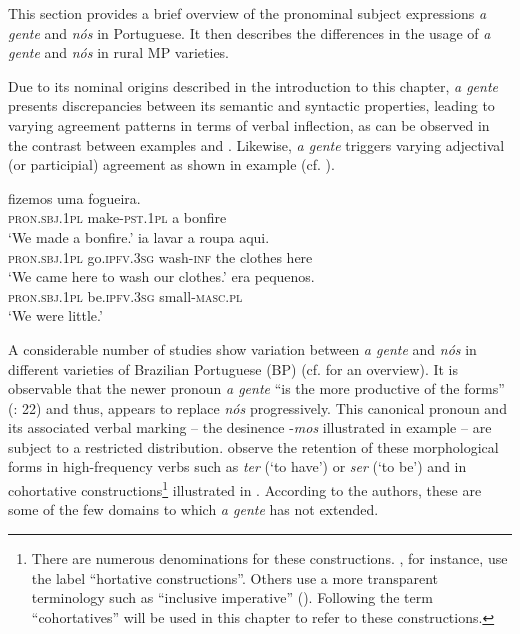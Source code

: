 \documentclass[output=paper]{langscibook}
\begin{document}
This section provides a brief overview of the  pronominal subject expressions \textit{a gente} and \textit{nós} in Portuguese. It then describes the differences in the usage of \textit{a gente} and \textit{nós} in rural MP varieties.



Due to its nominal origins described in the introduction to this chapter, \textit{a gente} presents discrepancies between its semantic and syntactic properties, leading to varying agreement patterns in terms of verbal inflection, as can be observed in the contrast between examples  and . Likewise, \textit{a gente} triggers varying adjectival (or participial) agreement as shown in example  (cf. \citealt{Pereira2003, CostaPereira2013,CostaPereira2005}). 

\ea\label{ex:henriques:5}
  fizemos uma fogueira.\\
         \textsc{pron.sbj.1pl} make-\textsc{pst.1pl} a bonfire\\
 \glt `We made a bonfire.'
\ex\label{ex:henriques:6}
  ia lavar a roupa aqui.\\
         \textsc{pron.sbj.1pl} go.\textsc{ipfv.3sg} wash-\textsc{inf} the clothes here\\
 \glt `We came here to wash our clothes.'
\ex\label{ex:henriques:7}
  era pequenos.\\
         \textsc{pron.sbj.1pl} be.\textsc{ipfv.3sg} small-\textsc{masc.pl}\\
 \glt `We were little.'
 \z 

A considerable number of studies show variation between \textit{a gente} and \textit{nós} in different varieties of Brazilian Portuguese (BP) (cf. \citealt{Vianna2011} for an overview). It is observable that the newer pronoun \textit{a gente} “is the more productive of the forms” (\citealt{TravisSilveira2009}: 22) and thus, appears to replace \textit{nós} progressively. This canonical pronoun and its associated  verbal marking  -- the desinence {}-\textit{mos} illustrated in example  --  are subject to a restricted distribution. \citet{TravisSilveira2009} observe the retention of these morphological forms in high-frequency verbs such as \textit{ter} (‘to have’) or \textit{ser} (‘to be’) and in cohortative constructions\footnote{There are numerous denominations for these constructions. \citet{TravisSilveira2009}, for instance, use the label “hortative constructions”. Others use a more transparent terminology such as “inclusive imperative” (\citealt{DobrushinaGoussev2005}). Following \citet{Posio2012} the term “cohortatives” will be used in this chapter to refer to these constructions.}  illustrated in . According to the authors, these are some of the few domains to which \textit{a gente} has not extended. 
\end{document}
